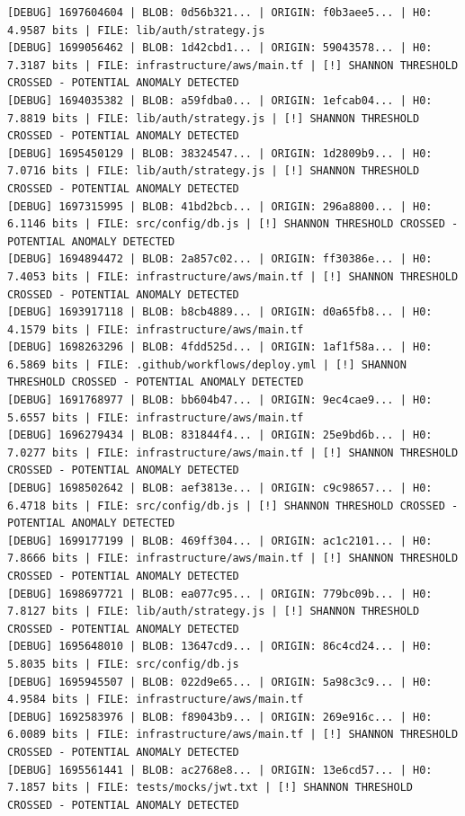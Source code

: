 \documentclass[12pt, a4paper, oneside]{report}
\begin{document}
\begin{lstlisting}[basicstyle=\tiny\ttfamily]
[DEBUG] 1697604604 | BLOB: 0d56b321... | ORIGIN: f0b3aee5... | H0: 4.9587 bits | FILE: lib/auth/strategy.js
[DEBUG] 1699056462 | BLOB: 1d42cbd1... | ORIGIN: 59043578... | H0: 7.3187 bits | FILE: infrastructure/aws/main.tf | [!] SHANNON THRESHOLD CROSSED - POTENTIAL ANOMALY DETECTED
[DEBUG] 1694035382 | BLOB: a59fdba0... | ORIGIN: 1efcab04... | H0: 7.8819 bits | FILE: lib/auth/strategy.js | [!] SHANNON THRESHOLD CROSSED - POTENTIAL ANOMALY DETECTED
[DEBUG] 1695450129 | BLOB: 38324547... | ORIGIN: 1d2809b9... | H0: 7.0716 bits | FILE: lib/auth/strategy.js | [!] SHANNON THRESHOLD CROSSED - POTENTIAL ANOMALY DETECTED
[DEBUG] 1697315995 | BLOB: 41bd2bcb... | ORIGIN: 296a8800... | H0: 6.1146 bits | FILE: src/config/db.js | [!] SHANNON THRESHOLD CROSSED - POTENTIAL ANOMALY DETECTED
[DEBUG] 1694894472 | BLOB: 2a857c02... | ORIGIN: ff30386e... | H0: 7.4053 bits | FILE: infrastructure/aws/main.tf | [!] SHANNON THRESHOLD CROSSED - POTENTIAL ANOMALY DETECTED
[DEBUG] 1693917118 | BLOB: b8cb4889... | ORIGIN: d0a65fb8... | H0: 4.1579 bits | FILE: infrastructure/aws/main.tf
[DEBUG] 1698263296 | BLOB: 4fdd525d... | ORIGIN: 1af1f58a... | H0: 6.5869 bits | FILE: .github/workflows/deploy.yml | [!] SHANNON THRESHOLD CROSSED - POTENTIAL ANOMALY DETECTED
[DEBUG] 1691768977 | BLOB: bb604b47... | ORIGIN: 9ec4cae9... | H0: 5.6557 bits | FILE: infrastructure/aws/main.tf
[DEBUG] 1696279434 | BLOB: 831844f4... | ORIGIN: 25e9bd6b... | H0: 7.0277 bits | FILE: infrastructure/aws/main.tf | [!] SHANNON THRESHOLD CROSSED - POTENTIAL ANOMALY DETECTED
[DEBUG] 1698502642 | BLOB: aef3813e... | ORIGIN: c9c98657... | H0: 6.4718 bits | FILE: src/config/db.js | [!] SHANNON THRESHOLD CROSSED - POTENTIAL ANOMALY DETECTED
[DEBUG] 1699177199 | BLOB: 469ff304... | ORIGIN: ac1c2101... | H0: 7.8666 bits | FILE: infrastructure/aws/main.tf | [!] SHANNON THRESHOLD CROSSED - POTENTIAL ANOMALY DETECTED
[DEBUG] 1698697721 | BLOB: ea077c95... | ORIGIN: 779bc09b... | H0: 7.8127 bits | FILE: lib/auth/strategy.js | [!] SHANNON THRESHOLD CROSSED - POTENTIAL ANOMALY DETECTED
[DEBUG] 1695648010 | BLOB: 13647cd9... | ORIGIN: 86c4cd24... | H0: 5.8035 bits | FILE: src/config/db.js
[DEBUG] 1695945507 | BLOB: 022d9e65... | ORIGIN: 5a98c3c9... | H0: 4.9584 bits | FILE: infrastructure/aws/main.tf
[DEBUG] 1692583976 | BLOB: f89043b9... | ORIGIN: 269e916c... | H0: 6.0089 bits | FILE: infrastructure/aws/main.tf | [!] SHANNON THRESHOLD CROSSED - POTENTIAL ANOMALY DETECTED
[DEBUG] 1695561441 | BLOB: ac2768e8... | ORIGIN: 13e6cd57... | H0: 7.1857 bits | FILE: tests/mocks/jwt.txt | [!] SHANNON THRESHOLD CROSSED - POTENTIAL ANOMALY DETECTED

\end{lstlisting}
\end{document}
